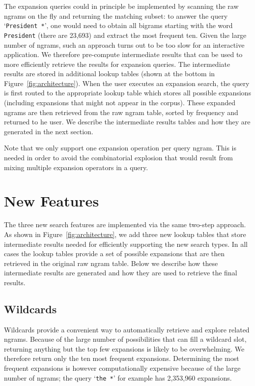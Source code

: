 \documentclass[11pt,a4paper]{article}
\newcommand{\query}[1]{\texttt{#1}}
\begin{document}
The expansion queries could in principle be implemented by scanning the raw ngrams on the fly and returning the matching subset: to answer the query `\query{President *}', one would need to obtain all bigrams starting with the word \query{President} (there are 23,693) and extract the most frequent ten. Given the large number of ngrams, such an approach turns out to be too slow for an interactive application. We therefore pre-compute intermediate results that can be used to more efficiently retrieve the results for expansion queries. The intermediate results are stored in additional lookup tables (shown at the bottom in Figure~\ref{fig:architecture}). When the user executes an expansion search, the query is first routed to the appropriate lookup table which stores all possible expansions (including expansions that might not appear in the corpus).  These expanded ngrams are then retrieved from the raw ngram table, sorted by frequency and returned to he user.
We describe the intermediate results tables and how they are generated in the next section.

Note that we only support one expansion operation per query ngram. This is needed in order to avoid the combinatorial explosion that would result from mixing multiple expansion operators in a query.


\section{New Features}
\label{sec:features}
The three new search features are implemented via the same two-step approach. As shown in Figure~\ref{fig:architecture}, we add three new lookup tables that store intermediate results needed for efficiently supporting the new search types. In all cases the lookup tables provide a set of possible expansions that are then retrieved in the original raw ngram table. Below we describe how these intermediate results are generated and how they are used to retrieve the final results.

\subsection{Wildcards}
\label{sec:wildcards}
	Wildcards provide a convenient way to automatically retrieve and explore related ngrams. Because of the large number of possibilities that can fill a wildcard slot, returning anything but the top few expansions is likely to be overwhelming. We therefore return only the ten most frequent expansions. Determining the most frequent expansions is however computationally expensive because of the large number of ngrams; the query `\query{the *}' for example has 2,353,960 expansions.
\end{document}
